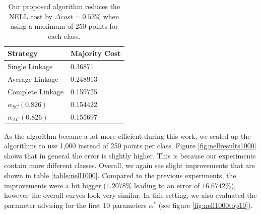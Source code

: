 \begin{table}[h]
    \centering
    \begin{tabular}{|l | l|}
    \hline
    Strategy & Majority Cost\\ \hline
    Single Linkage & 0.36871\\
    Average Linkage & 0.248913\\
    Complete Linkage & 0.159725\\
    \cellcolor{green!50}$\alpha_{SC}(0.826)$ & \cellcolor{green!50}0.154422\\
    $\alpha_{AC}(0.826)$ & 0.155697\\\hline
    \end{tabular}
    \caption{Our proposed algorithm reduces the NELL cost by $\Delta cost = 0.53\%$ when using a maximum of 250 points for each class.}
    \label{table:nellresults}
\end{table}

As the algorithm became a lot more efficient during this work, we scaled up the algorithms to use 1,000 instead of 250 points per class. Figure \ref{fig:nellresults1000} shows that in general the error is slightly higher. This is because our experiments contain more different classes. Overall, we again see slight improvements that are shown in table \ref{table:nell1000}. Compared to the previous experiments, the improvements were a bit bigger ($1.2078\%$ leading to an error of $16.6742\%$), however the overall curves look very similar. In this setting, we also evaluated the parameter advising for the first 10 parameters $\alpha^*$ (see figure \ref{fig:nell1000top10}).


